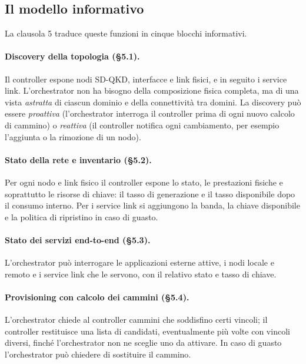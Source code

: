 \subsection{Il modello informativo}
\label{sec:infomodel}

La clausola 5 traduce queste funzioni in cinque blocchi informativi.

\paragraph{Discovery della topologia (§5.1).}
Il controller espone nodi SD-QKD, interfacce e link fisici, e in seguito i
service link. L'orchestrator non ha bisogno della composizione fisica
completa, ma di una vista \emph{astratta} di ciascun dominio e della
connettività tra domini. La discovery può essere \emph{proattiva}
(l'orchestrator interroga il controller prima di ogni nuovo calcolo di
cammino) o \emph{reattiva} (il controller notifica ogni cambiamento, per
esempio l'aggiunta o la rimozione di un nodo).

\paragraph{Stato della rete e inventario (§5.2).}
Per ogni nodo e link fisico il controller espone lo stato, le prestazioni
fisiche e soprattutto le risorse di chiave: il tasso di generazione e il
tasso disponibile dopo il consumo interno. Per i service link si aggiungono
la banda, la chiave disponibile e la politica di ripristino in caso di
guasto.

\paragraph{Stato dei servizi end-to-end (§5.3).}
L'orchestrator può interrogare le applicazioni esterne attive, i nodi
locale e remoto e i service link che le servono, con il relativo stato e
tasso di chiave.

\paragraph{Provisioning con calcolo dei cammini (§5.4).}
L'orchestrator chiede al controller cammini che soddisfino certi vincoli; il
controller restituisce una lista di candidati, eventualmente più volte con
vincoli diversi, finché l'orchestrator non ne sceglie uno da attivare. In
caso di guasto l'orchestrator può chiedere di sostituire il cammino.

